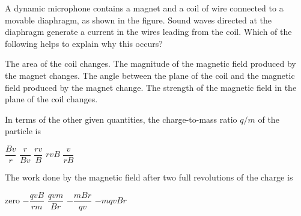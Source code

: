 \documentclass{../../oss-apphys-exam}
\begin{document}
\begin{multicols*}{2}
\begin{questions}
    \question A dynamic microphone contains a magnet and a coil of wire
    connected to a movable diaphragm, as shown in the figure. Sound waves
    directed at the diaphragm generate a current in the wires leading from the
    coil. Which of the following helps to explain why this occurs?
    \begin{choices}
      \choice The area of the coil changes.
      \choice The magnitude of the magnetic field produced by the magnet
      changes.
      \choice The angle between the plane of the coil and the magnetic field
      produced by the magnet change.
      \choice The strength of the magnetic field in the plane of the coil
      changes.
    \end{choices}
    \columnbreak
    

    \question In terms of the other given quantities, the charge-to-mass ratio
    $q/m$ of the particle is
    \begin{choices}
      \choice $\dfrac{Bv}r$
      \choice $\dfrac r{Bv}$
      \choice $\dfrac{rv}B$
      \choice $rvB$
      \choice $\dfrac v{rB}$
    \end{choices}
    \label{q:circ1}
    
    \question The work done by the magnetic field after two full revolutions of
    the charge is
    \begin{choices}
      \choice zero
      \choice $-\dfrac{qv B}{rm}$
      \choice $\dfrac{qv m}{Br}$
      \choice $-\dfrac{mBr}{qv}$
      \choice $-mqv Br$
    \end{choices}
    \label{q:circ2}
    

\end{questions}
\end{multicols*}
\end{document}
